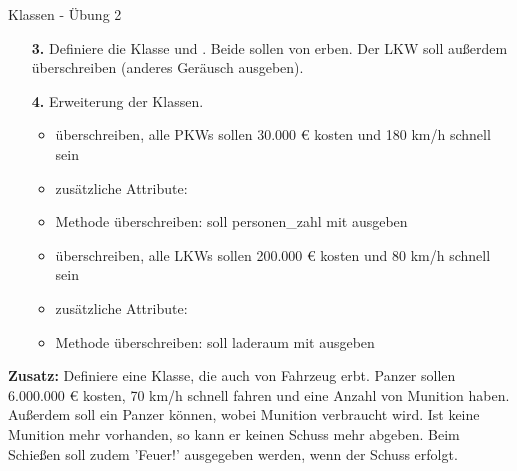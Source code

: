 \begin{frame}{Klassen - Übung 2}
	\begin{itemize}
		\item[\textbf{3.}] 
		Definiere die Klasse  und . Beide sollen von  erben.
		Der LKW soll außerdem  überschreiben (anderes Geräusch ausgeben).
		
		\item[\textbf{4.}] 
			Erweiterung der Klassen.\linebreak
			\begin{itemize}
				\item {} überschreiben, alle PKWs sollen 30.000 € kosten und 180 km/h schnell sein
				\item zusätzliche Attribute: 
				\item {} Methode überschreiben: soll personen\_zahl mit ausgeben
			\end{itemize}
		
			\begin{itemize}
				\item {} überschreiben, alle LKWs sollen 200.000 € kosten und 80 km/h schnell sein
				\item zusätzliche Attribute: 
				\item {} Methode überschreiben: soll laderaum mit ausgeben
			\end{itemize}
	\end{itemize}
\end{frame}

\begin{frame}
	\textbf{Zusatz:} Definiere eine  Klasse, die auch von Fahrzeug erbt. Panzer sollen 6.000.000 € kosten, 70 km/h schnell fahren und eine Anzahl von Munition haben. Außerdem soll ein Panzer  können, wobei Munition verbraucht wird. Ist keine Munition mehr vorhanden, so kann er keinen Schuss mehr abgeben. Beim Schießen soll zudem 'Feuer!' ausgegeben werden, wenn der Schuss erfolgt.
\end{frame}



